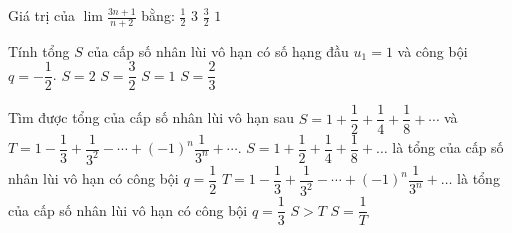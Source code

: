 \begin{ex}%
	Giá trị của $\lim \frac{3n + 1}{n + 2}$ bằng:
	\choice
	{$\frac{1}{2}$}
	{\True $3$}
	{$\frac{3}{2}$}
	{$1$}
\end{ex}

\begin{ex}%
	Tính tổng $S$ của cấp số nhân lùi vô  hạn có số hạng đầu $u_{1}=1$ và công bội $q=-\dfrac{1}{2}$.
	\choice 
		{$S=2$} 
		 {$S=\dfrac{3}{2}$}
		 {$S=1$}
		 {\True $S=\dfrac{2}{3}$}
\end{ex}

\begin{ex}%
	Tìm được tổng  của cấp số nhân lùi vô hạn sau $S=1+\dfrac{1}{2}+\dfrac{1}{4}+\dfrac{1}{8}+\cdots$ và $T=1-\dfrac{1}{3}+\dfrac{1}{3^2}-\cdots+(-1)^n \dfrac{1}{3^n}+\cdots$.
	 \choiceTF
		{\True $S=1+\dfrac{1}{2}+\dfrac{1}{4}+\dfrac{1}{8}+\ldots$ là tổng của cấp số  nhân lùi vô hạn có công bội $q=\dfrac{1}{2}$}
		{$T=1-\dfrac{1}{3}+\dfrac{1}{3^2}-\cdots+(-1)^n \dfrac{1}{3^n}+\ldots$ là tổng của cấp số nhân lùi vô hạn có công bội  $q=\dfrac{1}{3}$}
		{\True $S>  T$}
		 {$S=\dfrac{1}{T}$}
\end{ex}

